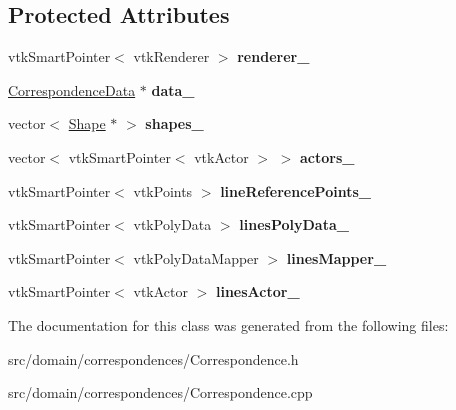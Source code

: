 \subsection*{Protected Attributes}
\begin{DoxyCompactItemize}
\item 
\hypertarget{class_correspondence_a872cd57c92e18a1af86793d8a0e29dae}{}vtk\+Smart\+Pointer$<$ vtk\+Renderer $>$ {\bfseries renderer\+\_\+}\label{class_correspondence_a872cd57c92e18a1af86793d8a0e29dae}

\item 
\hypertarget{class_correspondence_aa82f3556aebfd19e7fdcedd5338fd7c2}{}\hyperlink{class_correspondence_data}{Correspondence\+Data} $\ast$ {\bfseries data\+\_\+}\label{class_correspondence_aa82f3556aebfd19e7fdcedd5338fd7c2}

\item 
\hypertarget{class_correspondence_a209aad8fcf25d57cf5497c0e412a17a8}{}vector$<$ \hyperlink{class_shape}{Shape} $\ast$ $>$ {\bfseries shapes\+\_\+}\label{class_correspondence_a209aad8fcf25d57cf5497c0e412a17a8}

\item 
\hypertarget{class_correspondence_aee809c04f1f97da83f4ee6059b1a91bf}{}vector$<$ vtk\+Smart\+Pointer$<$ vtk\+Actor $>$ $>$ {\bfseries actors\+\_\+}\label{class_correspondence_aee809c04f1f97da83f4ee6059b1a91bf}

\item 
\hypertarget{class_correspondence_ad4330bf4a1bb84fbe67e2563c8baa8c3}{}vtk\+Smart\+Pointer$<$ vtk\+Points $>$ {\bfseries line\+Reference\+Points\+\_\+}\label{class_correspondence_ad4330bf4a1bb84fbe67e2563c8baa8c3}

\item 
\hypertarget{class_correspondence_aca2749697165656c651cf41b5208b7fa}{}vtk\+Smart\+Pointer$<$ vtk\+Poly\+Data $>$ {\bfseries lines\+Poly\+Data\+\_\+}\label{class_correspondence_aca2749697165656c651cf41b5208b7fa}

\item 
\hypertarget{class_correspondence_af77759b08266d787154b30a36c24b33a}{}vtk\+Smart\+Pointer$<$ vtk\+Poly\+Data\+Mapper $>$ {\bfseries lines\+Mapper\+\_\+}\label{class_correspondence_af77759b08266d787154b30a36c24b33a}

\item 
\hypertarget{class_correspondence_a7950b1784f8318a085c5f7d126bd1984}{}vtk\+Smart\+Pointer$<$ vtk\+Actor $>$ {\bfseries lines\+Actor\+\_\+}\label{class_correspondence_a7950b1784f8318a085c5f7d126bd1984}

\end{DoxyCompactItemize}


The documentation for this class was generated from the following files\+:\begin{DoxyCompactItemize}
\item 
src/domain/correspondences/Correspondence.\+h\item 
src/domain/correspondences/Correspondence.\+cpp\end{DoxyCompactItemize}
